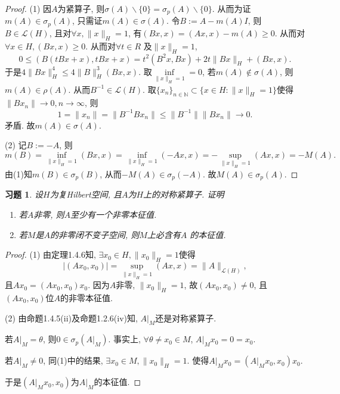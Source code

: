 \documentclass[UTF8,twoside]{ctexbook}
\newtheorem{exercise}{习题}[section]
\newcommand{\h}{\mathscr}
\newcommand{\kx}{\mathbb}
\numberwithin{equation}{section}
\begin{document}
	\begin{proof}
		(1) 因$A$为紧算子, 则$\sigma(A)\backslash\{0\}=\sigma_p(A)\backslash\{0\}$. 从而为证$m(A)\in\sigma_p(A)$, 只需证$m(A)\in\sigma(A)$. 令$B:=A-m(A)I$, 则$B\in\h L(H)$, 且对$\forall x, \|x\|_H=1$, 有$(Bx,x)=(Ax,x)-m(A)\geq 0$. 从而对$\forall x\in H, (Bx,x)\geq 0$. 从而对$\forall t\in R$ 及$\|x\|_H=1$,
		\[
		0\leq (B(tBx+x),tBx+x)=t^2(B^2x,Bx)+2t\|Bx\|_H+(Bx,x).
		\]
		于是$4\|Bx\|_H^4\leq 4\|B\|^3_H(Bx,x)$. 取$\inf\limits_{\|x\|_H=1}=0$, 若$m(A)\notin \sigma(A)$, 则$m(A)\in\rho(A)$. 从而$B^{-1}\in \h L(H)$. 取$\{x_n\}_{n\in\kx N}\subset\{x\in H:\|x\|_H=1\}$使得$\|Bx_n\|\rightarrow 0,n\rightarrow\infty$, 则
		\[
		1=\|x_n\|=\|B^{-1}Bx_n\|\leq\|B^{-1}\|\|Bx_n\|\rightarrow 0.
		\]
		矛盾. 故$m(A)\in\sigma(A)$.

		(2) 记$B:=-A$, 则
		\[
		m(B)=\inf\limits_{\|x\|_H=1}(Bx,x)=\inf_{\|x\|_H=1}(-Ax,x)=-\sup_{\|x\|_H=1}(Ax,x)=-M(A).
		\]
		由(1)知$m(B)\in\sigma_p(B)$, 从而$-M(A)\in\sigma_p(-A)$. 故$M(A)\in\sigma_p(A)$.
	\end{proof}

	\begin{exercise}
		设$H$为复Hilbert空间, 且$A$为$H$上的对称紧算子. 证明
		\begin{enumerate}[(1)]
			\item 若$A$非零, 则$A$至少有一个非零本征值.
			\item 若$M$是$A$的非零闭不变子空间, 则$M$上必含有$A$ 的本征值.
		\end{enumerate}
	\end{exercise}
	\begin{proof}
		(1) 由定理1.4.6知, $\exists x_0\in H, \|x_0\|_H=1$使得
		\[
		|(Ax_0,x_0)|=\sup_{\|x\|_H=1}(Ax,x)=\|A\|_{\h L(H)},
		\]
		且$Ax_0=(Ax_0,x_0)x_0$. 因为$A$非零, $\|x_0\|_H=1$, 故$(Ax_0,x_0)\neq 0$, 且$(Ax_0,x_0)$位$A$的非零本征值.

		(2) 由命题1.4.5(ii)及命题1.2.6(iv)知, $A|_M$还是对称紧算子.

		若$A|_M=\theta$, 则$0\in\sigma_p(A|_M)$. 事实上, $\forall\theta\neq x_0\in M$, $A|_Mx_0=0=x_0$.

		若$A|_M\neq 0$, 同(1)中的结果, $\exists x_0\in M, \|x_0\|_H=1$. 使得$A|_Mx_0=(A|_Mx_0,x_0)x_0$.

		于是$(A|_Mx_0,x_0)$为$A|_M$的本征值.
	\end{proof}
\end{document}
